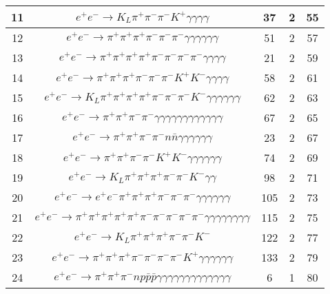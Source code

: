 \documentclass[landscape]{article}
\begin{document}
\begin{table}[htbp!]
\begin{tabular}{|c|c|c|c|c|}
\hline
11 & $ e^{+} e^{-} \rightarrow K_{L} \pi^{+} \pi^{-} \pi^{-} K^{+} \gamma \gamma \gamma \gamma $ & 37 & 2 & 55 \\
\hline
12 & $ e^{+} e^{-} \rightarrow \pi^{+} \pi^{+} \pi^{+} \pi^{-} \pi^{-} \pi^{-} \gamma \gamma \gamma \gamma \gamma \gamma $ & 51 & 2 & 57 \\
\hline
13 & $ e^{+} e^{-} \rightarrow \pi^{+} \pi^{+} \pi^{+} \pi^{+} \pi^{-} \pi^{-} \pi^{-} \pi^{-} \gamma \gamma \gamma \gamma $ & 21 & 2 & 59 \\
\hline
14 & $ e^{+} e^{-} \rightarrow \pi^{+} \pi^{+} \pi^{+} \pi^{-} \pi^{-} \pi^{-} K^{+} K^{-} \gamma \gamma \gamma \gamma $ & 58 & 2 & 61 \\
\hline
15 & $ e^{+} e^{-} \rightarrow K_{L} \pi^{+} \pi^{+} \pi^{+} \pi^{+} \pi^{-} \pi^{-} \pi^{-} K^{-} \gamma \gamma \gamma \gamma \gamma \gamma $ & 62 & 2 & 63 \\
\hline
16 & $ e^{+} e^{-} \rightarrow \pi^{+} \pi^{+} \pi^{-} \pi^{-} \gamma \gamma \gamma \gamma \gamma \gamma \gamma \gamma \gamma \gamma \gamma \gamma $ & 67 & 2 & 65 \\
\hline
17 & $ e^{+} e^{-} \rightarrow \pi^{+} \pi^{+} \pi^{-} \pi^{-} n \bar{n} \gamma \gamma \gamma \gamma \gamma \gamma $ & 23 & 2 & 67 \\
\hline
18 & $ e^{+} e^{-} \rightarrow \pi^{+} \pi^{+} \pi^{-} \pi^{-} K^{+} K^{-} \gamma \gamma \gamma \gamma \gamma \gamma $ & 74 & 2 & 69 \\
\hline
19 & $ e^{+} e^{-} \rightarrow K_{L} \pi^{+} \pi^{+} \pi^{+} \pi^{-} \pi^{-} K^{-} \gamma \gamma $ & 98 & 2 & 71 \\
\hline
20 & $ e^{+} e^{-} \rightarrow e^{+} e^{-} \pi^{+} \pi^{+} \pi^{+} \pi^{-} \pi^{-} \pi^{-} \gamma \gamma \gamma \gamma \gamma \gamma $ & 105 & 2 & 73 \\
\hline
21 & $ e^{+} e^{-} \rightarrow \pi^{+} \pi^{+} \pi^{+} \pi^{+} \pi^{+} \pi^{-} \pi^{-} \pi^{-} \pi^{-} \pi^{-} \gamma \gamma \gamma \gamma \gamma \gamma \gamma \gamma $ & 115 & 2 & 75 \\
\hline
22 & $ e^{+} e^{-} \rightarrow K_{L} \pi^{+} \pi^{+} \pi^{+} \pi^{-} \pi^{-} K^{-} $ & 122 & 2 & 77 \\
\hline
23 & $ e^{+} e^{-} \rightarrow \pi^{+} \pi^{+} \pi^{+} \pi^{-} \pi^{-} \pi^{-} \pi^{-} K^{+} \gamma \gamma \gamma \gamma \gamma \gamma $ & 133 & 2 & 79 \\
\hline
24 & $ e^{+} e^{-} \rightarrow \pi^{+} \pi^{+} \pi^{-} n p \bar{p} \bar{p} \gamma \gamma \gamma \gamma \gamma \gamma \gamma \gamma \gamma \gamma \gamma \gamma \gamma $ & 6 & 1 & 80 \\

\end{tabular}
\end{table}
\end{document}
